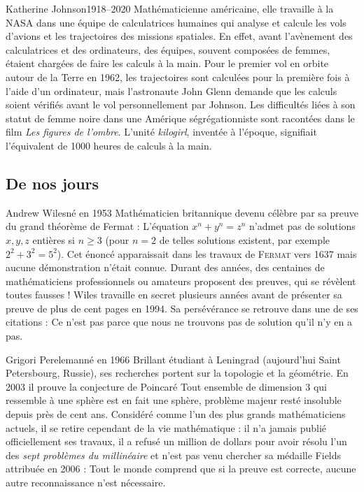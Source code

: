 \documentclass[10pt,class=article,crop=false]{standalone}
\begin{document}
\begin{multicols}{2}
\begin{biographie}{Katherine Johnson}{1918--2020}
Mathématicienne américaine, elle travaille à la NASA dans une équipe de \og{}calculatrices humaines\fg{} qui analyse et calcule les vols d'avions et les trajectoires des missions spatiales. En effet, avant l'avènement des calculatrices et des ordinateurs, des  équipes, souvent composées de femmes, étaient chargées de faire les calculs à la main. 
Pour le premier vol en orbite autour de la Terre en 1962, les trajectoires sont calculées pour la première fois à l'aide d'un ordinateur, mais l'astronaute John Glenn demande que les calculs soient vérifiés avant le vol personnellement par Johnson.
Les difficultés liées à son statut de femme noire dans une Amérique ségrégationniste sont racontées dans le film \emph{Les figures de l'ombre}. L'unité \emph{kilogirl}, inventée à l'époque, signifiait l'équivalent de 1000 heures de calculs à la main.
\end{biographie}


\subsection{De nos jours}

\begin{biographie}{Andrew Wiles}{né en 1953}
Mathématicien britannique devenu célèbre par sa preuve du grand théorème de Fermat : \og{}L'équation $x^n+y^n = z^n$ n'admet pas de solutions $x,y,z$ entières si $n\ge3$\fg{} (pour $n=2$ de telles solutions existent, par exemple $2^2+3^2=5^2$). Cet énoncé apparaissait dans les travaux de \textsc{Fermat} vers 1637 mais aucune démonstration n'était connue. 
Durant des années, des centaines de mathématiciens professionnels ou amateurs proposent des preuves, qui se révèlent toutes fausses !
Wiles travaille en secret plusieurs années avant de présenter sa preuve de plus de cent pages en 1994. Sa persévérance se retrouve dans une de ses citations :
\og{}Ce n'est pas parce que nous ne trouvons pas de solution qu'il n'y en a pas.\fg{}
\end{biographie}


\begin{biographie}{Grigori Pereleman}{né en 1966}
Brillant étudiant à Leningrad (aujourd'hui Saint Petersbourg, Russie), ses recherches portent sur la topologie et la géométrie.
En 2003 il prouve la conjecture de Poincaré \og{}Tout ensemble de dimension 3 qui ressemble à une sphère est en fait une sphère\fg{}, problème majeur resté insoluble depuis près de cent ans.
Considéré comme l'un des plus grands mathématiciens actuels, il se retire cependant de la vie mathématique : il n'a jamais publié officiellement ses travaux, il a refusé un million de dollars pour avoir résolu l'un des \emph{sept problèmes du millinéaire} et n'est pas venu chercher sa médaille Fields attribuée en 2006 : \og{}Tout le monde comprend que si la preuve est correcte, aucune autre reconnaissance n'est nécessaire.\fg{}
\end{biographie}



\end{multicols}
\end{document}
